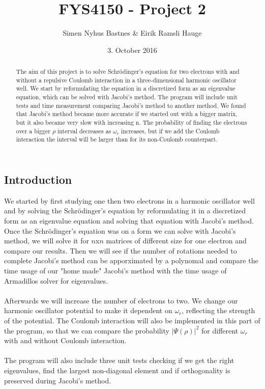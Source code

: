 \documentclass{article}
\title{FYS4150 - Project 2}
\author{Simen Nyhus Bastnes \& Eirik Ramsli Hauge}
\date{3. October 2016}
\begin{document}
\maketitle
\begin{abstract}
The aim of this project is to solve Schrödinger's equation for two electrons with and without a repulsive Coulomb interaction in a three-dimensional harmonic oscillator well. We start by reformulating the equation in a discretized form as an eigenvalue equation, which can be solved with Jacobi's method. The program will include unit tests and time measurement comparing Jacobi's method to another method. We found that Jacobi's method became more accurate if we started out with a bigger matrix, but it also became very slow with increasing n. The probability of finding the electrons over a bigger $\rho$ interval decreases as $\omega_r$ increases, but if we add the Coulomb interaction the interval will be larger than for its non-Coulomb counterpart.
\end{abstract}
\subsection{Introduction}
We started by first studying one then two electrons in a harmonic oscillator well and by solving the Schrödinger's equation by reformulating it in a discretized form as an eigenvalue equation and solving that equation with Jacobi's method. \\
Once the Schrödinger's equation was on a form we can solve with Jacobi's method, we will solve it for $n$x$n$ matrices of different size for one electron and compare our results. Then we will see if the number of rotations needed to complete Jacobi's method can be apporximated by a polynomal and compare the time usage of our "home made" Jacobi's method with the time usage of Armadillos solver for eigenvalues. \\ \\
Afterwards we will increase the number of electrons to two. We change our harmonic oscillator potential to make it dependent on $\omega_r$, reflecting the strength of the potential. The Coulomb interaction will also be implemented in this part of the program, so that we can compare the probability $|\Psi(\rho)|^2$ for different $\omega_r$ with and without Coulomb interaction. \\ \\
The program will also include three unit tests checking if we get the right eigenvalues, find the largest non-diagonal element and if orthogonality is preserved during Jacobi's method. 
\end{document}
